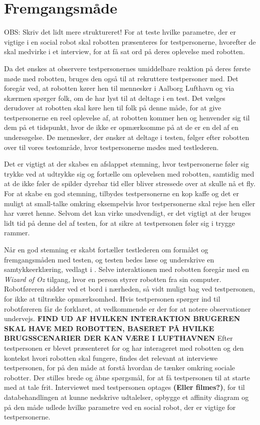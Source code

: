 \section{Fremgangsmåde}
\label{ParametreFremgangsmaade}
%
OBS: Skriv det lidt mere struktureret!\blankline
%
For at teste hvilke parametre, der er vigtige i en social robot skal robotten præsenteres for testpersonerne, hvorefter de skal medvirke i et interview, for at få sat ord på deres oplevelse med robotten. 

Da det ønskes at observere testpersonernes umiddelbare reaktion på deres første møde med robotten, bruges den også til at rekruttere testpersoner med. Det foregår ved, at robotten kører hen til mennesker i Aalborg Lufthavn og via skærmen spørger folk, om de har lyst til at deltage i en test. Det vælges derudover at robotten skal køre hen til folk på denne måde, for at give testpersonerne en reel oplevelse af, at robotten kommer hen og henvender sig til dem på et tidspunkt, hvor de ikke er opmærksomme på at de er en del af en undersøgelse. De mennesker, der ønsker at deltage i testen, følger efter robotten over til vores testområde, hvor testpersonerne mødes med testlederen.\blankline

Det er vigtigt at der skabes en afslappet stemning, hvor testpersonerne føler sig trykke ved at udtrykke sig og fortælle om oplevelsen med robotten, samtidig med at de ikke føler de spilder dyrebar tid eller bliver stressede over at skulle nå et fly. For at skabe en god stemning, tilbydes testpersonerne en kop kaffe og det er muligt at small-talke omkring eksempelvis hvor testpersonerne skal rejse hen eller har været henne. Selvom det kan virke unødvendigt, er det vigtigt at der bruges lidt tid på denne del af testen, for at sikre at testpersonen føler sig i trygge rammer. 

Når en god stemning er skabt fortæller testlederen om formålet og fremgangsmåden med testen, og testen bedes læse og underskrive en samtykkeerklæring, vedlagt i .\blankline
%
Selve interaktionen med robotten foregår med en \textit{Wizard of Oz} tilgang, hvor en person styrer robotten fra sin computer. Robotføreren sidder ved et bord i nærheden, så vidt muligt bag ved testpersonen, for ikke at tiltrække opmærksomhed. Hvis testpersonen spørger ind til robotføreren får de forklaret, at vedkommende er der for at notere observationer undervejs. 
\textbf{FIND UD AF HVILKEN INTERAKTION BRUGEREN SKAL HAVE MED ROBOTTEN, BASERET PÅ HVILKE BRUGSSCENARIER DER KAN VÆRE I LUFTHAVNEN} \blankline
%
Efter testpersonen er blevet præsenteret for og har interageret med robotten og den kontekst hvori robotten skal fungere, findes det relevant at interviewe testpersonen, for på den måde at forstå hvordan de tænker omkring sociale robotter. Der stilles brede og åbne spørgsmål, for at få testpersonen til at starte med at tale frit. Interviewet med testpersonen optages \textbf{(Eller filmes?)}, for til databehandlingen at kunne nedskrive udtalelser, opbygge et affinity diagram og på den måde udlede hvilke parametre ved en social robot, der er vigtige for testpersonerne.
